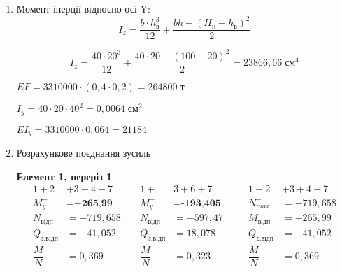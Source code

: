 \documentclass[a4paper,14pt]{article}
\begin{document}
\begin{enumerate}
    \item Момент інерції відносно осі Y:
    \begin{equation}
        I_z = \dfrac{b\cdot h^3_\textit{в}}{12}+\dfrac{bh-(H_\textit{н}-h_\textit{в})^2}{2} 
    \end{equation}
    
    $$I_z = \dfrac{40\cdot 20^3}{12}+\dfrac{40\cdot 20-(100-20)^2}{2}=23866,66\;\textit{см}^4$$

    $EF=3310000\cdot (0,4\cdot 0,2) = 264800\;\textit{т}$

    $I_y = 40 \cdot 20\cdot 40^2 = 0,0064\;\textit{см}^2$

    $EI_y = 3310000\cdot 0,064 = 21184$

    \item Розрахункове поєднання зусиль
    
    \textbf{Елемент 1, переріз 1}
    \begin{equation*}
        \begin{aligned}
        1+2&+3+4-7\qquad  &1+&3+6+7 &1+2&+3+4-7\\
        M^+_y &= \textbf{+265,99} &M^-_y &= \textbf{-193,405}\qquad &N^-_{max} &= -719,658\\
        N_\textit{відп} &= -719,658  &N_\textit{відп} &= -597,47 &M_\textit{відп} &= +265,99 \\
        Q_\textit{z.відп} &= -41,052 &Q_\textit{z.відп} &= 18,078 &Q_\textit{z.відп} &= -41,052 \\
        \dfrac{M}{N}&=0,369  &\dfrac{M}{N}&=0,323 &\dfrac{M}{N}&=0,369 
        \end{aligned}
    \end{equation*}
 

\end{enumerate}
\end{document}
